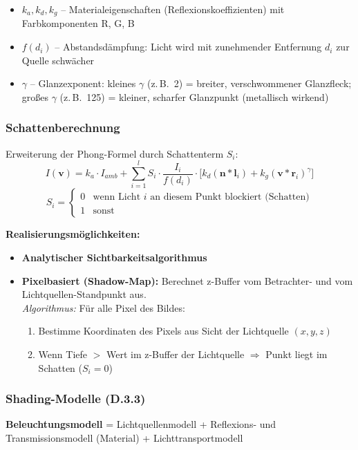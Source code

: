 \documentclass[12pt, a4paper]{article}
\begin{document}
\begin{itemize}
  \item $k_a, k_d, k_g$ -- Materialeigenschaften (Reflexionskoeffizienten) mit Farbkomponenten R, G, B
  \item $f(d_i)$ -- Abstandsdämpfung: Licht wird mit zunehmender Entfernung $d_i$ zur Quelle schwächer
  \item $\gamma$ -- Glanzexponent: kleines $\gamma$ (z.\,B.\ 2) = breiter, verschwommener Glanzfleck; großes $\gamma$ (z.\,B.\ 125) = kleiner, scharfer Glanzpunkt (metallisch wirkend)
\end{itemize}

\subsubsection*{Schattenberechnung}

Erweiterung der Phong-Formel durch Schattenterm $S_i$:
\[
  I(\mathbf{v}) = k_a \cdot I_{amb} + \sum_{i=1}^{l} S_i \cdot \frac{I_i}{f(d_i)} \cdot \bigl[k_d(\mathbf{n} \ast \mathbf{l}_i) + k_g(\mathbf{v} \ast \mathbf{r}_i)^{\gamma}\bigr]
\]
\[
  S_i = \begin{cases} 0 & \text{wenn Licht } i \text{ an diesem Punkt blockiert (Schatten)} \\ 1 & \text{sonst} \end{cases}
\]

\textbf{Realisierungsmöglichkeiten:}
\begin{itemize}
  \item \textbf{Analytischer Sichtbarkeitsalgorithmus}
  \item \textbf{Pixelbasiert (Shadow-Map):} Berechnet z-Buffer vom Betrachter- und vom Lichtquellen-Standpunkt aus.\\
    \textit{Algorithmus:} Für alle Pixel des Bildes:
    \begin{enumerate}
      \item Bestimme Koordinaten des Pixels aus Sicht der Lichtquelle $(x,y,z)$
      \item Wenn Tiefe $>$ Wert im z-Buffer der Lichtquelle $\Rightarrow$ Punkt liegt im Schatten ($S_i = 0$)
    \end{enumerate}
\end{itemize}

\subsubsection*{Shading-Modelle (D.3.3)}

\textbf{Beleuchtungsmodell} = Lichtquellenmodell + Reflexions- und Transmissionsmodell (Material) + Lichttransportmodell
\end{document}
